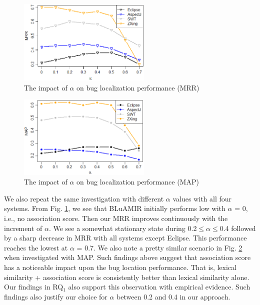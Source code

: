 \documentclass[conference]{IEEEtran}
\begin{document}
\begin{figure}[!t]
	\centering
	\includegraphics[width=2.5in]{alpha-calibration-mrr}
	\vspace{-.3cm}
	\caption{The impact of $\alpha$ on bug localization performance (MRR)}
	\label{fig:MRR-alpha-cali}
	\vspace{-.3cm}
\end{figure}
\begin{figure}[!t]
	\centering
	\includegraphics[width=2.5in]{alpha-calibration-map}
	\vspace{-.3cm}
	\caption{The impact of $\alpha$ on bug localization performance (MAP)}
	\label{fig:MAP-alpha-cali}
	\vspace{-.5cm}
\end{figure}
We also repeat the same investigation with different $\alpha$ values with all four systems. From Fig. \ref{fig:MRR-alpha-cali}, we see that BLuAMIR initially performs low with $\alpha$ = 0, i.e., no association score. Then our MRR improves continuously with the increment of $\alpha$. We see a somewhat stationary state during 0.2$\le\alpha\le$0.4 followed by a sharp decrease in MRR with all systems except Eclipse.
This performance reaches the lowest at $\alpha$ = 0.7.
We also note a pretty similar scenario in Fig. \ref{fig:MAP-alpha-cali} when investigated with MAP.
Such findings above suggest that association score has a noticeable impact upon the bug location performance. That is, lexical similarity + association score is consistently better than lexical similarity alone. Our findings in RQ$_1$ also support this observation with empirical evidence. Such findings also justify our choice for $\alpha$ between 0.2 and 0.4 in our approach. 
\end{document}

